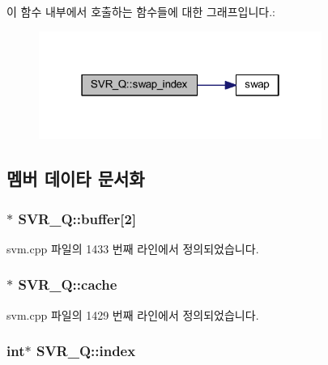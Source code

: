 이 함수 내부에서 호출하는 함수들에 대한 그래프입니다.\+:
\nopagebreak
\begin{figure}[H]
\begin{center}
\leavevmode
\includegraphics[width=262pt]{class_s_v_r___q_a9d3884f0c68f4ce18d47570e4a203405_cgraph}
\end{center}
\end{figure}




\subsection{멤버 데이타 문서화}
\hypertarget{class_s_v_r___q_a294d15ab4ee01b92c960a604afbd6f9f}{
\subsubsection[{buffer}]{$\ast$ S\+V\+R\+\_\+\+Q\+::buffer\mbox{[}2\mbox{]}\hspace{0.3cm}{\ttfamily [private]}}}\label{class_s_v_r___q_a294d15ab4ee01b92c960a604afbd6f9f}


svm.\+cpp 파일의 1433 번째 라인에서 정의되었습니다.

\hypertarget{class_s_v_r___q_acb75212bdcc8128a28b35601f8265828}{
\subsubsection[{cache}]{$\ast$ S\+V\+R\+\_\+\+Q\+::cache\hspace{0.3cm}{\ttfamily [private]}}}\label{class_s_v_r___q_acb75212bdcc8128a28b35601f8265828}


svm.\+cpp 파일의 1429 번째 라인에서 정의되었습니다.

\hypertarget{class_s_v_r___q_a29e769c577358f518182ba3cbe255817}{
\subsubsection[{index}]{\setlength{\rightskip}{0pt plus 5cm}int$\ast$ S\+V\+R\+\_\+\+Q\+::index\hspace{0.3cm}{\ttfamily [private]}}}\label{class_s_v_r___q_a29e769c577358f518182ba3cbe255817}


